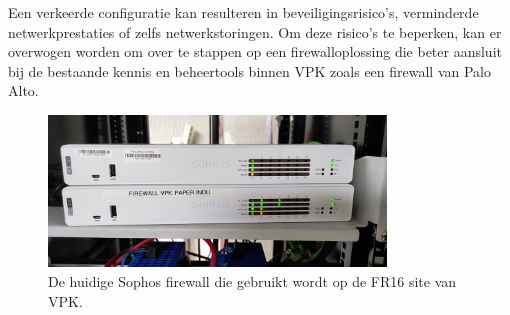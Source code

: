 Een verkeerde configuratie kan resulteren in beveiligingsrisico’s, verminderde netwerkprestaties of zelfs netwerkstoringen. Om deze risico’s te beperken, kan er overwogen worden om over te stappen op een firewalloplossing die beter aansluit bij de bestaande kennis en beheertools binnen VPK zoals een firewall van Palo Alto.\newline

\begin{figure}[H]
    \centering
    \includegraphics[width=0.8\textwidth]{fotos/SophosFirewall.jpg}
    \caption[Sophos Firewall]{\label{fig:grail}De huidige Sophos firewall die gebruikt wordt op de FR16 site van VPK.}
\end{figure} 

